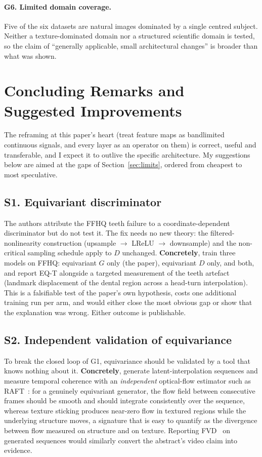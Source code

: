 \documentclass[11pt,a4paper]{article}
\begin{document}
\paragraph{G6. Limited domain coverage.} Five of
the six datasets are natural images dominated by a single centred subject. Neither
a texture-dominated domain nor a structured scientific domain is tested, so the
claim of ``generally applicable, small architectural changes'' is broader than
what was shown.

\section{Concluding Remarks and Suggested Improvements}

The reframing at this paper's heart (treat feature maps as bandlimited
continuous signals, and every layer as an operator on them) is correct, useful
and transferable, and I expect it to outlive the specific architecture. My
suggestions below are aimed at the gaps of Section~\ref{sec:limits}, ordered from
cheapest to most speculative.

\subsection*{S1. Equivariant discriminator}

The authors attribute the FFHQ teeth failure to a coordinate-dependent
discriminator but do not test it. The fix needs no new theory: the
filtered-nonlinearity construction (upsample $\to$ LReLU $\to$ downsample) and
the non-critical sampling schedule apply to $D$ unchanged. \textbf{Concretely},
train three models on FFHQ: equivariant $G$ only (the paper), equivariant $D$
only, and both, and report EQ-T alongside a targeted measurement of the teeth
artefact (landmark displacement of the dental region across a head-turn
interpolation). This is a falsifiable test of the paper's own hypothesis, costs
one additional training run per arm, and would either close the most obvious gap
or show that the explanation was wrong. Either outcome is publishable.

\subsection*{S2. Independent validation of equivariance}

To break the closed loop of G1, equivariance should be validated by a tool that
knows nothing about it. \textbf{Concretely}, generate latent-interpolation
sequences and measure temporal coherence with an \emph{independent} optical-flow
estimator such as RAFT~\citep{teed2020raft}: for a genuinely equivariant
generator, the flow field between consecutive frames should be smooth and should
integrate consistently over the sequence, whereas texture sticking produces
near-zero flow in textured regions while the underlying structure moves,
a signature that is easy to quantify as the divergence between flow measured on
structure and on texture. Reporting FVD~\citep{unterthiner2018fvd} on generated
sequences would similarly convert the abstract's video claim into evidence.
\end{document}
